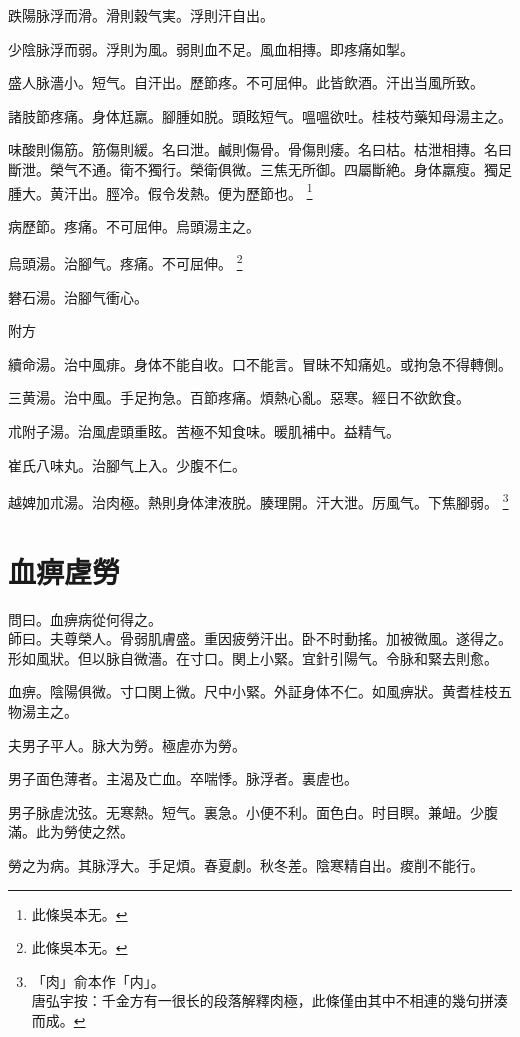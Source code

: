 \documentclass[b5paper,twoside,zihao=-4,UTF8]{ctexbook}
\begin{document}
跌陽脉浮而滑。滑則穀气実。浮則汗自出。

少陰脉浮而弱。浮則为風。弱則血不足。風血相摶。即疼痛如掣。

盛人脉濇小。短气。自汗出。歷節疼。不可屈伸。此皆飲酒。汗出当風所致。

諸肢節疼痛。身体尪羸。腳腫如脱。頭眩短气。嗢嗢欲吐。桂枝芍藥知母湯主之。

味酸則傷筋。筋傷則緩。名曰泄。鹹則傷骨。骨傷則痿。名曰枯。枯泄相摶。名曰斷泄。榮气不通。衛不獨行。榮衛俱微。三焦无所御。四屬斷絶。身体羸瘦。獨足腫大。黄汗出。脛冷。假令发熱。便为歷節也。
	\footnote{此條吳本无。}

病歷節。疼痛。不可屈伸。烏頭湯主之。

烏頭湯。治腳气。疼痛。不可屈伸。
	\footnote{此條吳本无。}

礬石湯。治腳气衝心。

附方

續命湯。治中風痱。身体不能自收。口不能言。冒昧不知痛処。或拘急不得轉側。

三黄湯。治中風。手足拘急。百節疼痛。煩熱心亂。惡寒。經日不欲飲食。

朮附子湯。治風虗頭重眩。苦極不知食味。暖肌補中。益精气。

崔氏八味丸。治腳气上入。少腹不仁。

越婢加朮湯。治肉極。熱則身体津{液}脱。腠理開。汗大泄。厉風气。下焦腳弱。
	\footnote{「肉」俞本作「内」。\\唐弘宇按：千金方有一很长的段落解釋肉極，此條僅由其中不相連的幾句拼湊而成。}

\chapter{血痹虗勞}

問曰。血痹病從何得之。\\
師曰。夫尊榮人。骨弱肌膚盛。重因疲勞汗出。卧不时動搖。加被微風。遂得之。{形如風狀。}但以脉自微濇。在寸口。関上小緊。宜針引陽气。令脉和緊去則愈。

血痹。陰陽俱微。寸口関上微。尺中小緊。外証身体不仁。如風痹狀。黄耆桂枝五物湯主之。

夫男子平人。脉大为勞。極虗亦为勞。

男子面色薄者。主渴及亡血。卒喘悸。脉浮者。裏虗也。

男子脉虗沈弦。无寒熱。短气。裏急。小便不利。面色白。时目瞑。兼衄。少腹滿。此为勞使之然。

勞之为病。其脉浮大。手足煩。春夏劇。秋冬差。陰寒精自出。痠削不能行。
\end{document}
